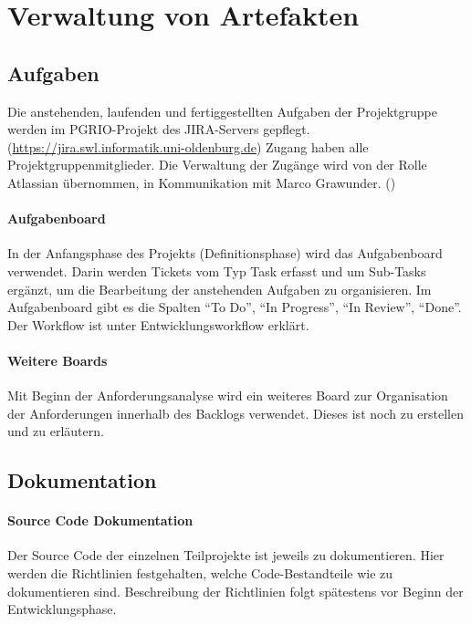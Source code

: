 \newcommand{\textbi}[1]{\textit{\textbf{#1}}}

\section{Verwaltung von Artefakten}
\subsection{Aufgaben}
Die anstehenden, laufenden und fertiggestellten Aufgaben der Projektgruppe werden im PGRIO-Projekt des JIRA-Servers gepflegt. (\url{https://jira.swl.informatik.uni-oldenburg.de}) Zugang haben alle Projektgruppenmitglieder. Die Verwaltung der Zugänge wird von der Rolle Atlassian übernommen, in Kommunikation mit Marco Grawunder. ()

\paragraph{Aufgabenboard}
In der Anfangsphase des Projekts (Definitionsphase) wird das Aufgabenboard verwendet. Darin werden Tickets vom Typ Task erfasst und um Sub-Tasks ergänzt, um die Bearbeitung der anstehenden Aufgaben zu organisieren. Im Aufgabenboard gibt es die Spalten "`To Do"', "`In Progress"', "`In Review"', "`Done"'. Der Workflow ist unter Entwicklungsworkflow erklärt.

\paragraph{Weitere Boards}
Mit Beginn der Anforderungsanalyse wird ein weiteres Board zur Organisation der Anforderungen innerhalb des Backlogs verwendet. Dieses ist noch zu erstellen und zu erläutern.

\subsection{Dokumentation}
\paragraph{Source Code Dokumentation}
Der Source Code der einzelnen Teilprojekte ist jeweils zu dokumentieren. Hier werden die Richtlinien festgehalten, welche Code-Bestandteile wie zu dokumentieren sind. Beschreibung der Richtlinien folgt spätestens vor Beginn der Entwicklungsphase.

